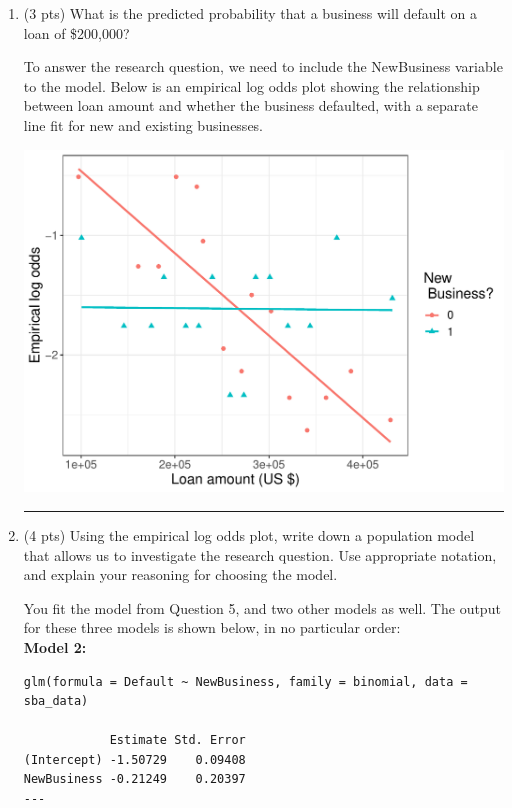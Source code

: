 \documentclass[11pt]{article}
\begin{document}
\begin{enumerate}
\vspace{3cm}

\item (3 pts) What is the predicted probability that a business will default on a loan of \$200,000?


\newpage

To answer the research question, we need to include the NewBusiness variable to the model. Below is an empirical log odds plot showing the relationship between loan amount and whether the business defaulted, with a separate line fit for new and existing businesses.

\begin{center}
\includegraphics[scale=0.7]{empirical_log_odds_exam_1.pdf}
\end{center}

\rule{\textwidth}{1pt}


\item (4 pts) Using the empirical log odds plot, write down a population model that allows us to investigate the research question. Use appropriate notation, and explain your reasoning for choosing the model.

\pagebreak

You fit the model from Question 5, and two other models as well. The output for these three models is shown below, in no particular order:\\


\textbf{Model 2:}

\begin{verbatim}
glm(formula = Default ~ NewBusiness, family = binomial, data = sba_data)

            Estimate Std. Error 
(Intercept) -1.50729    0.09408 
NewBusiness -0.21249    0.20397 
---


\end{verbatim}
\end{enumerate}
\end{document}
